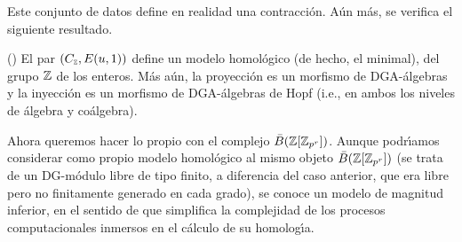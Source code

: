 Este conjunto de datos define en realidad una contracci\'{o}n. A\'{u}n
m\'{a}s, se verifica el siguiente resultado.

\begin{thr} (\cite{EM54}) \label{5-teorema-bz}
El par $(C_{\scriptscriptstyle {{\Bbb Z}}}, E(u,1))$ define un modelo homol\'{o}gico
(de hecho, el minimal), del grupo ${\Bbb Z}$ de los enteros. M\'{a}s
a\'{u}n, la proyecci\'{o}n es un morfismo de DGA-\'{a}lgebras y la
inyecci\'{o}n es un morfismo de DGA-\'{a}lgebras de Hopf (i.e., en
ambos los niveles de \'{a}lgebra y co\'{a}lgebra).
\end{thr}

Ahora queremos hacer lo propio con el complejo $\bar{B}({\Bbb Z} [{\Bbb Z}
_{p^r}])$. Aunque podr\'{\i}amos considerar como propio modelo
homol\'{o}gico al mismo objeto $\bar{B}({\Bbb Z} [{\Bbb Z} _{p^r}])$ (se trata
de un DG-m\'{o}dulo libre de tipo finito, a diferencia del caso
anterior, que era libre pero no finitamente generado en cada
grado), se conoce un modelo de magnitud inferior, en el sentido de
que simplifica la complejidad de los procesos computacionales
inmersos en el c\'{a}lculo de su homolog\'{\i}a.

